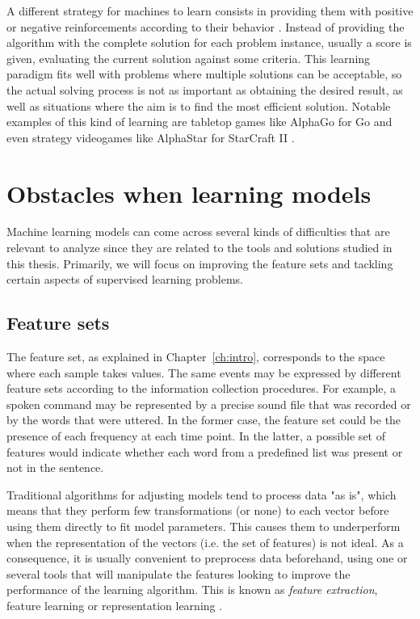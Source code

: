 A different strategy for machines to learn consists in providing them with positive or negative reinforcements according to their behavior . Instead of providing the algorithm with the complete solution for each problem instance, usually a score is given, evaluating the current solution against some criteria. This learning paradigm fits well with problems where multiple solutions can be acceptable, so the actual solving process is not as important as obtaining the desired result, as well as situations where the aim is to find the most efficient solution. Notable examples of this kind of learning are tabletop games like AlphaGo for Go  and even strategy videogames like AlphaStar for StarCraft II .


\section{Obstacles when learning models}

Machine learning models can come across several kinds of difficulties that are relevant to analyze since they are related to the tools and solutions studied in this thesis. Primarily, we will focus on improving the feature sets and tackling certain aspects of supervised learning problems.

\subsection{Feature sets}

The feature set, as explained in Chapter~\ref{ch:intro}, corresponds to the space where each sample takes values. The same events may be expressed by different feature sets according to the information collection procedures. For example, a spoken command may be represented by a precise sound file that was recorded or by the words that were uttered. In the former case, the feature set could be the presence of each frequency at each time point. In the latter, a possible set of features would indicate whether each word from a predefined list was present or not in the sentence.

Traditional algorithms for adjusting models tend to process data "as is", which means that they perform few transformations (or none) to each vector before using them directly to fit model parameters. This causes them to underperform when the representation of the vectors (i.e. the set of features) is not ideal. As a consequence, it is usually convenient to preprocess data beforehand, using one or several tools that will manipulate the features looking to improve the performance of the learning algorithm. This is known as \textit{feature extraction}, feature learning or representation learning . 

